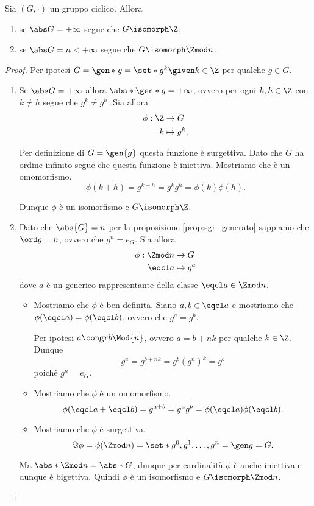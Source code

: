 \begin{theorem}
    \label{th:iso_ciclico}
    Sia $(G, \cdot)$ un gruppo ciclico. Allora \begin{enumerate}[label={(\roman*)}, ref={\thetheorem: (\roman*)}]
        \item se $\abs G = +\infty$ segue che $G \isomorph \Z$;
        \item se $\abs G = n < +\infty$ segue che $G \isomorph \Zmod n$.
    \end{enumerate}
\end{theorem}
\begin{proof}
    Per ipotesi $G = \gen*{g} = \set*{g^k \given k \in \Z}$ per qualche $g \in G$.
    \begin{enumerate}[label={(\roman*)}]
        \item Se $\abs G = +\infty$ allora $\abs*{\gen*{g}} = +\infty$, ovvero per ogni $k, h \in \Z$ con $k \neq h$ segue che $g^k \neq g^h$. Sia allora \begin{align*}
            \phi : \Z &\to G\\
            k &\mapsto g^k.
        \end{align*}

        Per definizione di $G = \gen{g}$ questa funzione è surgettiva. Dato che $G$ ha ordine infinito segue che questa funzione è iniettiva. Mostriamo che è un omomorfismo. \[
            \phi(k + h) = g^{k + h} = g^kg^h = \phi(k)\phi(h).    
        \]

        Dunque $\phi$ è un isomorfismo e $G \isomorph \Z$.
        \item Dato che $\abs{G} = n$ per la proposizione \ref{prop:sgr_generato} sappiamo che $\ord g = n$, ovvero che $g^n = e_G$. Sia allora \begin{align*}
            \phi : \Zmod n &\to G\\
            \eqcl a &\mapsto g^a
        \end{align*} dove $a$ è un generico rappresentante della classe $\eqcl a \in \Zmod n$. \begin{itemize}
            \item Mostriamo che $\phi$ è ben definita. Siano $a, b \in \eqcl a$ e mostriamo che $\phi(\eqcl a) = \phi(\eqcl b)$, ovvero che $g^a = g^b$. 
            
            Per ipotesi $a \congr b \Mod{n}$, ovvero $a = b+nk$ per qualche $k \in \Z$. Dunque \[
                g^a = g^{b + nk} = g^b(g^n)^k = g^b    
            \] poiché $g^n = e_G$.
            \item Mostriamo che $\phi$ è un omomorfismo. \[
                \phi(\eqcl a + \eqcl b) = g^{a + b} = g^ag^b = \phi(\eqcl a)\phi(\eqcl b).
            \] \item Mostriamo che $\phi$ è surgettiva. \[
                \Im \phi = \phi(\Zmod n) = \set*{g^0, g^1, \dots, g^n} = \gen g = G.    
            \]
        \end{itemize}
        Ma $\abs*{\Zmod n} = \abs*{G}$, dunque per cardinalità $\phi$ è anche iniettiva e dunque è bigettiva. 
        Quindi $\phi$ è un isomorfismo e $G \isomorph \Zmod n$.
    \end{enumerate}
\end{proof}

